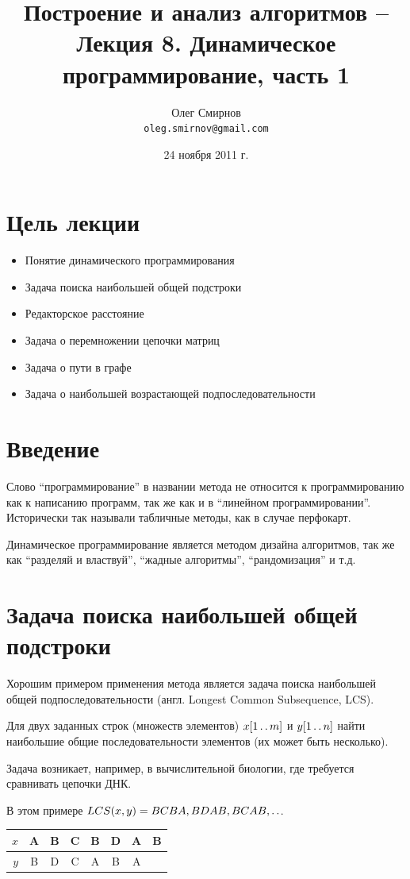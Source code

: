 \documentclass[a4paper,11pt]{article}
\author{Олег Смирнов\\
\texttt{oleg.smirnov@gmail.com}}
\date{24 ноября 2011 г.}
\title{Построение и анализ алгоритмов -- Лекция 8. Динамическое
программирование, часть 1}
\begin{document}
\maketitle
\tableofcontents
\newpage

\setlength{\parskip}{1ex plus 0.5ex minus 0.2ex}

\section*{Цель лекции}
\begin{itemize}
\item Понятие динамического программирования
\item Задача поиска наибольшей общей подстроки
\item Редакторское расстояние
\item Задача о перемножении цепочки матриц
\item Задача о пути в графе
\item Задача о наибольшей возрастающей подпоследовательности
\end{itemize}

\section{Введение}
Слово ``программирование'' в названии метода не относится к программированию как
к написанию программ, так же как и в ``линейном программировании''. Исторически
так называли табличные методы, как в случае перфокарт.

Динамическое программирование является методом дизайна алгоритмов, так же как
``разделяй и властвуй'', ``жадные алгоритмы'', ``рандомизация'' и т.д.

\section{Задача поиска наибольшей общей подстроки}
Хорошим примером применения метода является задача поиска наибольшей общей
подпоследовательности (англ. Longest Common Subsequence, LCS).

Для двух заданных строк (множеств элементов) $x[1 \mathinner{\ldotp\ldotp} m]$ и $y[1 \mathinner{\ldotp\ldotp} n]$
найти наибольшие общие последовательности элементов (их может быть несколько).

Задача возникает, например, в вычислительной биологии, где требуется сравнивать
цепочки ДНК.

В этом примере $LCS(x, y) = BCBA, BDAB, BCAB, \mathinner{\ldotp\ldotp}$.
\begin{center}
\begin{tabular}{|r|c|c|c|c|c|c|c|}
  \hline
     $x$ & A & B & C & B & D & A & B \\
  \hline
     $y$ & B & D & C & A & B & A &   \\
  \hline
\end{tabular}
\end{center}
\end{document}
